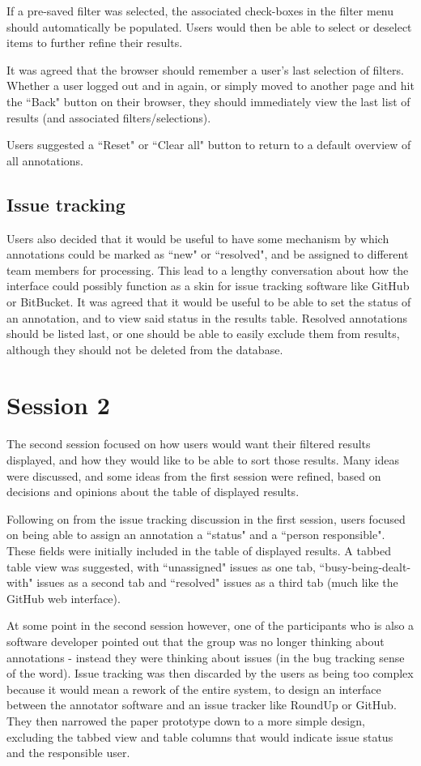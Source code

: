 If a pre-saved filter was selected, the associated check-boxes in the filter menu should automatically be populated. Users would then be able to select or deselect items to further refine their results.

It was agreed that the browser should remember a user's last selection of filters. Whether a user logged out and in again, or simply moved to another page and hit the ``Back" button on their browser, they should immediately view the last list of results (and associated filters/selections).

Users suggested a ``Reset" or ``Clear all" button to return to a default overview of all annotations. 

\subsection{Issue tracking}
Users also decided that it would be useful to have some mechanism by which annotations could be marked as ``new" or ``resolved", and be assigned to different team members for processing. This lead to a lengthy conversation about how the interface could possibly function as a skin for issue tracking software like GitHub or BitBucket. It was agreed that it would be useful to be able to set the status of an annotation, and to view said status in the results table. Resolved annotations should be listed last, or one should be able to easily exclude them from results, although they should not be deleted from the database.

\section{Session 2}
The second session focused on how users would want their filtered results displayed, and how they would like to be able to sort those results. Many ideas were discussed, and some ideas from the first session were refined, based on decisions and opinions about the table of displayed results. 

Following on from the issue tracking discussion in the first session, users focused on being able to assign an annotation a ``status" and a ``person responsible". These fields were initially included in the table of displayed results. A tabbed table view was suggested, with ``unassigned" issues as one tab, ``busy-being-dealt-with" issues as a second tab and ``resolved" issues as a third tab (much like the GitHub web interface). 

At some point in the second session however, one of the participants who is also a software developer pointed out that the group was no longer thinking about annotations - instead they were thinking about issues (in the bug tracking sense of the word). Issue tracking was then discarded by the users as being too complex because it would mean a rework of the entire system, to design an interface between the annotator software and an issue tracker like RoundUp or GitHub. They then narrowed the paper prototype down to a more simple design, excluding the tabbed view and table columns that would indicate issue status and the responsible user.

